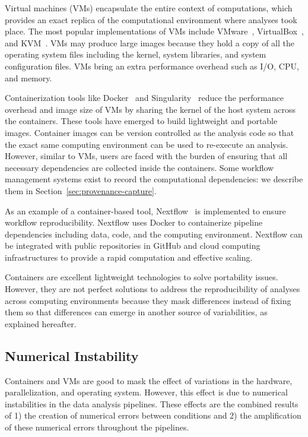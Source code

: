 Virtual machines (VMs) encapsulate the entire context of 
computations, which provides an exact replica of the computational 
environment where analyses took place. The most popular implementations 
of VMs include VMware~\cite{wiki:vmware}, 
VirtualBox~\cite{watson2008virtualbox}, and KVM~\cite{kivity2007kvm}. 
VMs may produce large images because they hold a copy of all the 
operating system files including the kernel, system libraries, and system 
configuration files. VMs bring an extra 
performance overhead such as I/O, CPU, and memory.

Containerization tools like 
Docker~\cite{boettiger2015introduction} and 
Singularity~\cite{kurtzer2017singularity} reduce the 
performance overhead and image size of VMs by sharing the kernel of the 
host system across the containers. These tools have emerged to build 
lightweight and portable images. Container images can be version 
controlled as the analysis code so that the exact same 
computing environment can be used to re-execute an analysis. However, 
similar to VMs, users are faced with the burden of ensuring that all 
necessary dependencies are collected inside the containers. 
Some workflow management systems exist to record the 
computational dependencies: we describe them in Section~\ref{sec:provenance-capture}. 

As an example of a container-based tool, Nextflow~\cite{di2017nextflow} 
is implemented to ensure workflow reproducibility. Nextflow uses Docker 
to containerize pipeline dependencies including data, code, and the 
computing environment. Nextflow can be integrated with public 
repositories in GitHub and cloud computing infrastructures to provide a 
rapid computation and effective scaling. 

Containers are excellent lightweight technologies to solve 
portability issues. However, they are not perfect solutions to address 
the reproducibility of analyses across computing environments because 
they mask differences instead of fixing them so that differences
can emerge in another source of variabilities, as explained hereafter.

\subsection{Numerical Instability}

Containers and VMs are good to mask the effect of variations in the hardware, 
parallelization, and operating system. However, this effect is due to 
numerical instabilities in the data analysis 
pipelines. These effects are the combined results of 1) 
the creation of numerical errors between conditions and 2) the 
amplification of these numerical errors throughout the pipelines. 

